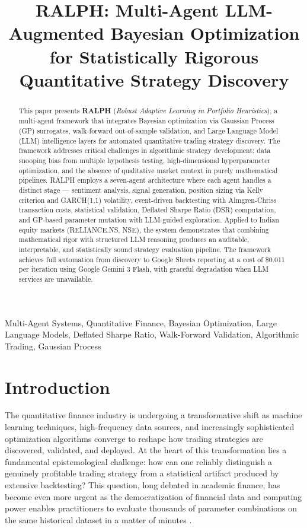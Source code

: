 \documentclass[conference]{IEEEtran}
\title{RALPH: Multi-Agent LLM-Augmented Bayesian Optimization for Statistically Rigorous Quantitative Strategy Discovery}
\author{
\IEEEauthorblockN{Lakshin Pathak}
\IEEEauthorblockA{Tatvic Analytics, Ahmedabad, India}
\IEEEauthorblockA{Email: lakshin@tatvic.com}
}
\begin{document}
\maketitle

\begin{abstract}
This paper presents \textbf{RALPH} (\textit{Robust Adaptive Learning in Portfolio Heuristics}), a multi-agent framework that integrates Bayesian optimization via Gaussian Process (GP) surrogates, walk-forward out-of-sample validation, and Large Language Model (LLM) intelligence layers for automated quantitative trading strategy discovery. The framework addresses critical challenges in algorithmic strategy development: data snooping bias from multiple hypothesis testing, high-dimensional hyperparameter optimization, and the absence of qualitative market context in purely mathematical pipelines. RALPH employs a seven-agent architecture where each agent handles a distinct stage --- sentiment analysis, signal generation, position sizing via Kelly criterion and GARCH(1,1) volatility, event-driven backtesting with Almgren-Chriss transaction costs, statistical validation, Deflated Sharpe Ratio (DSR) computation, and GP-based parameter mutation with LLM-guided exploration. Applied to Indian equity markets (RELIANCE.NS, NSE), the system demonstrates that combining mathematical rigor with structured LLM reasoning produces an auditable, interpretable, and statistically sound strategy evaluation pipeline. The framework achieves full automation from discovery to Google Sheets reporting at a cost of \$0.011 per iteration using Google Gemini 3 Flash, with graceful degradation when LLM services are unavailable.
\end{abstract}

\begin{IEEEkeywords}
Multi-Agent Systems, Quantitative Finance, Bayesian Optimization, Large Language Models, Deflated Sharpe Ratio, Walk-Forward Validation, Algorithmic Trading, Gaussian Process
\end{IEEEkeywords}

\section{Introduction}
\label{sec:introduction}

The quantitative finance industry is undergoing a transformative shift as machine learning techniques, high-frequency data sources, and increasingly sophisticated optimization algorithms converge to reshape how trading strategies are discovered, validated, and deployed. At the heart of this transformation lies a fundamental epistemological challenge: how can one reliably distinguish a genuinely profitable trading strategy from a statistical artifact produced by extensive backtesting? This question, long debated in academic finance, has become even more urgent as the democratization of financial data and computing power enables practitioners to evaluate thousands of parameter combinations on the same historical dataset in a matter of minutes \cite{harvey2016backtesting}.
\end{document}
